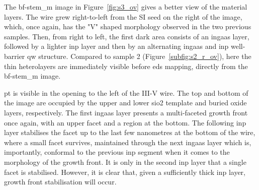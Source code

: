 The \acs{bf}-\acs{stem_m} image in Figure~\ref{fig:s3_ov} gives a better view of the material layers. The wire grew right-to-left from the \acl{SI} seed on the right of the image, which, once again, has the "V" shaped morphology observed in the two previous samples. Then, from right to left, the first dark area consists of an \acs{ingaas} layer, followed by a lighter \acs{inp} layer and then by an alternating \acs{ingaas} and \acs{inp} well-barrier \acl{qw} structure. Compared to sample 2 (Figure~\ref{subfig:s2_r_ov}), here the thin heterolayers are immediately visible before \acs{eds} mapping, directly from the \acs{bf}-\acs{stem_m} image.

\Acl{pt} is visible in the opening to the left of the III-V wire. The top and bottom of the image are occupied by the upper and lower \acs{sio2} template and buried oxide layers, respectively. The first \acs{ingaas} layer presents a multi-faceted growth front once again, with an upper  facet and a  region at the bottom. The following \acs{inp} layer stabilises the  facet up to the last few nanometres at the bottom of the wire, where a small  facet survives, maintained through the next \acs{ingaas} layer which is, importantly, conformal to the previous \acs{inp} segment when it comes to the morphology of the growth front. It is only in the second \acs{inp} layer that a single  facet is stabilised. However, it is clear that, given a sufficiently thick \acs{inp} layer, growth front stabilisation will occur.

